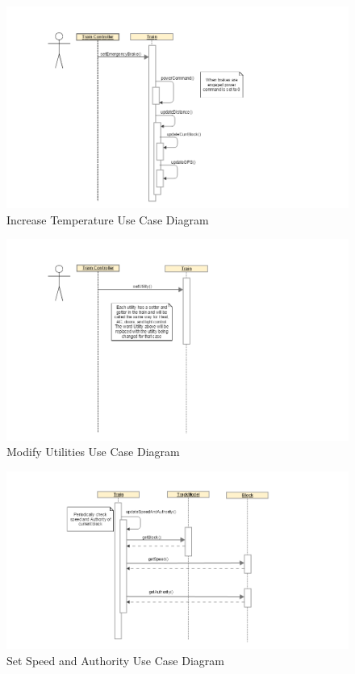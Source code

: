 \documentclass[]{article}
\begin{document}
\begin{figure}[H]
	\centering
	\includegraphics[scale=.5]{train_model_sqd_increase_temp.png}
	\caption{Increase Temperature Use Case Diagram}
\end{figure}

\begin{figure}[H]
	\centering
	\includegraphics[scale=.5]{train_model_sqd_modify_utlilties.png}
	\caption{Modify Utilities Use Case Diagram}
\end{figure}

\begin{figure}[H]
	\centering
	\includegraphics[scale=.5]{train_model_sqd_set_speed_authority.png}
	\caption{Set Speed and Authority Use Case Diagram}
\end{figure}
\end{document}
